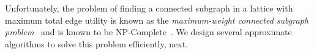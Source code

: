 {%
Unfortunately, the problem of finding a 
connected subgraph in a lattice with 
maximum total edge utility is known 
as the \emph{maximum-weight connected subgraph problem}~\cite{ErnstAlthaus2009} 
and is known to be {\sc NP-Complete}~\cite{Parameswaran2010}. 
We design several approximate algorithms to solve this problem efficiently, next.
}